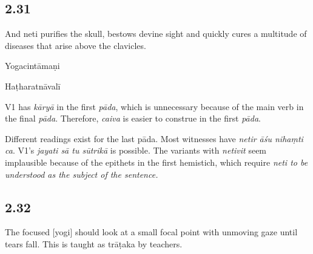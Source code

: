 \begin{ekdosis}
\subsection*{2.31}
\begin{translation}[hp02_031]
And neti purifies the skull, bestows devine sight and quickly cures a multitude of diseases that arise above the clavicles.
\end{translation}

\begin{sources}[hp02_031]
\end{sources}

\begin{testimonia}[hp02_031]
Yogacintāmaṇi

\begin{versinnote}
\end{versinnote}

Haṭharatnāvalī

\begin{versinnote}
\end{versinnote}
\end{testimonia}

\begin{philcomm}[hp02_031]
V1 has \emph{kāryā} in the first \emph{pāda}, which is unnecessary because of the main verb in the final \emph{pāda}. Therefore, \emph{caiva} is easier to construe in the first \emph{pāda}. 

Different readings exist for the last pāda. Most witnesses have \emph{netir āśu nihaṃti ca}. V1's \emph{jayati sā tu sūtrikā} is possible. The variants with \emph{netivit} seem implausible because of the epithets in the first hemistich, which require \sl{neti} to be understood as the subject of the sentence.
\end{philcomm}

\subsection*{2.32}
\begin{translation}[hp02_032]
The focused [yogi] should look at a small focal point with unmoving gaze until tears fall. This is taught as trāṭaka by teachers.
\end{translation}


\end{ekdosis}
